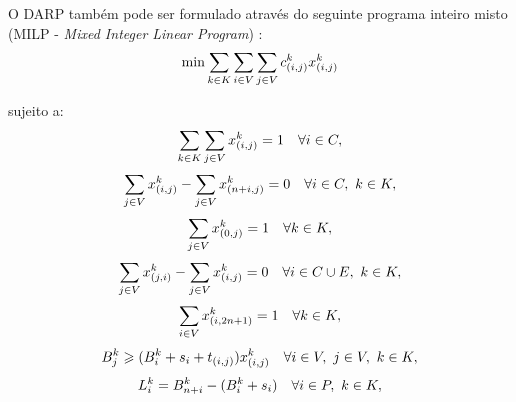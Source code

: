 O DARP também pode ser formulado através do seguinte programa inteiro misto 
(MILP - \textit{Mixed Integer Linear Program}) 
\cite{cordeau_branch-and-cut_2006}: 
\newline
%
\begin{equation} \label{eq:darp_objective}
  \min \sum_{k \in K}
       \sum_{i \in V}
       \sum_{j \in V}
  c_{(i,j)}^{k}
  x_{(i, j)}^{k}
\end{equation}

\noindent sujeito a:
%
\begin{equation} \label{eq:darp_constraint_1}
  \sum_{k \in K}
  \sum_{j \in V}
  x_{(i, j)}^{k} 
  = 1
  \quad 
  \forall i \in C,
\end{equation}
%
\begin{equation} \label{eq:darp_constraint_2}
  \sum_{j \in V}
  x_{(i, j)}^{k} 
  -
  \sum_{j \in V}
    x_{(n + i, j)}^{k} 
  = 0
  \quad 
  \forall i \in C, 
  \ k \in K,
\end{equation}
%
\begin{equation} \label{eq:darp_constraint_3}
  \sum_{j \in V}
  x_{(0, j)}^{k} 
  = 1
  \quad
  \forall k \in K,
\end{equation}
%
\begin{equation} \label{eq:darp_constraint_4}
  \sum_{j \in V}
   x_{(j, i)}^{k} 
   -
   \sum_{j \in V}
   x_{(i, j)}^{k} 
   = 0
   \quad
   \forall i \in C \cup E, 
   \ k \in K,
\end{equation}
%
\begin{equation} \label{eq:darp_constraint_5}
  \sum_{i \in V}
   x_{(i, 2n + 1)}^{k} 
   = 1
   \quad \forall k \in K,
\end{equation}
%
\begin{equation} \label{eq:darp_constraint_6}
  B_{j}^{k}
  \geqslant
  (B_{i}^{k} + s_i + t_{(i,j)})
  x_{(i, j)}^{k} 
  \quad
  \forall i \in V, 
  \ j \in V, 
  \ k \in K,
\end{equation}
%
\begin{equation} \label{eq:darp_constraint_8}
  L_i^k
  =
  B^k_{n+i}
  -
  (B^k_{i} + s_i)
  \quad
  \forall i \in P,
  \ k \in K,
\end{equation}

